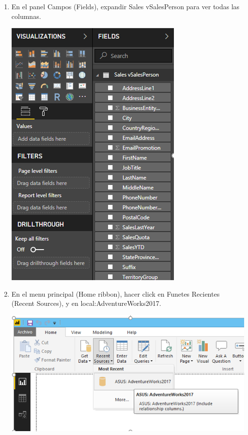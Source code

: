 \begin{itemize}
\begin{enumerate}
\item En el panel Campos (Fields), expandir Sales vSalesPerson para ver todas las columnas.

\begin{center}
\includegraphics[scale=0.55]{./Imagenes/a7.png}
\end{center}


\item En el menu principal (Home ribbon), hacer click en Funetes Recientes (Recent Sources), y en local:AdventureWorks2017. 

\begin{center}
\includegraphics[scale=0.55]{./Imagenes/a8.png}
\end{center}


\end{enumerate}
\end{itemize}
